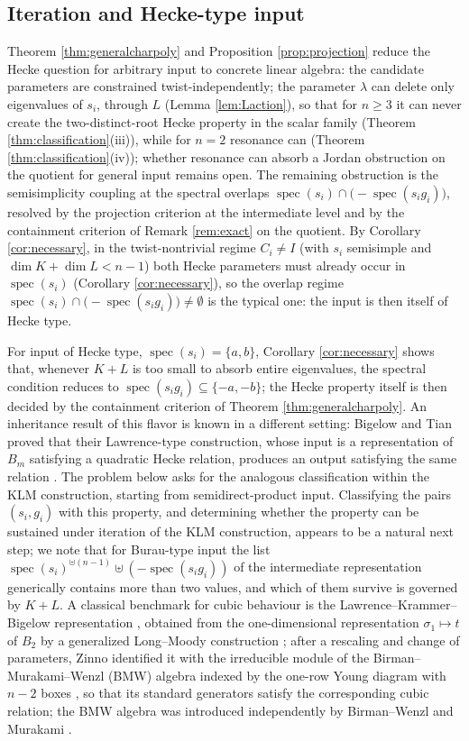 \documentclass[11pt]{article}
\theoremstyle{definition}
\theoremstyle{remark}
\newcommand{\spec}{\operatorname{spec}}
\begin{document}
\subsection*{Iteration and Hecke-type input}
Theorem \ref{thm:generalcharpoly} and Proposition \ref{prop:projection}
reduce the Hecke question for arbitrary input to concrete linear
algebra: the candidate parameters are constrained twist-independently;
the parameter $\lambda$ can delete only eigenvalues of $s_i$, through
$L$ (Lemma \ref{lem:Laction}), so that for $n \geq 3$ it can never
create the two-distinct-root Hecke property in the scalar family
(Theorem \ref{thm:classification}(iii)), while for $n = 2$ resonance
can (Theorem \ref{thm:classification}(iv)); whether resonance can
absorb a Jordan obstruction on the quotient for general input remains
open. The remaining
obstruction is the semisimplicity coupling at the spectral overlaps
$\spec(s_i) \cap \bigl(-\spec(s_i g_i)\bigr)$, resolved by the
projection criterion at the intermediate level and by the containment
criterion of Remark \ref{rem:exact} on the quotient. By Corollary
\ref{cor:necessary}, in the twist-nontrivial regime $C_i \neq I$ (with
$s_i$ semisimple and $\dim K + \dim L < n - 1$) both Hecke parameters must already
occur in $\spec(s_i)$ (Corollary \ref{cor:necessary}), so the overlap
regime $\spec(s_i) \cap \bigl(-\spec(s_i g_i)\bigr) \neq \emptyset$ is
the typical one: the
input is then itself of Hecke type.

For input of Hecke type, $\spec(s_i) = \{a, b\}$, Corollary
\ref{cor:necessary} shows that, whenever $K + L$ is too small to absorb
entire eigenvalues, the spectral condition reduces to
$\spec(s_i g_i) \subseteq \{-a, -b\}$; the Hecke property itself is
then decided by the containment criterion of Theorem
\ref{thm:generalcharpoly}. An inheritance result of this flavor is
known in a different setting: Bigelow and Tian proved that their
Lawrence-type construction, whose input is a representation of $B_m$
satisfying a quadratic Hecke relation, produces an output satisfying the
same relation \cite[Theorem 5.4]{BigelowTian08}. The problem below asks
for the analogous classification within the KLM construction, starting
from semidirect-product input. Classifying the pairs $(s_i, g_i)$ with
this property, and determining whether the property can be sustained under
iteration of the KLM construction, appears to be a natural next step; we
note that for Burau-type input the list
$\spec(s_i)^{\uplus(n-1)} \uplus (-\spec(s_i g_i))$ of the intermediate
representation generically contains more than two values, and which of
them survive is governed by $K + L$. A classical benchmark for cubic
behaviour is the Lawrence--Krammer--Bigelow representation
\cite{Lawrence90, Krammer02, Bigelow01}, obtained from the
one-dimensional representation $\sigma_1 \mapsto t$ of $B_2$ by a
generalized Long--Moody construction
\cite[Theorem~5.3]{BigelowTian08}; after a rescaling and change of
parameters, Zinno identified it with the irreducible module of the
Birman--Murakami--Wenzl (BMW) algebra indexed by the one-row Young
diagram with $n - 2$ boxes \cite{Zinno01}, so that its standard
generators satisfy the corresponding cubic relation; the BMW algebra
was introduced independently by Birman--Wenzl and Murakami
\cite{BirmanWenzl89, Murakami87}.
\end{document}
